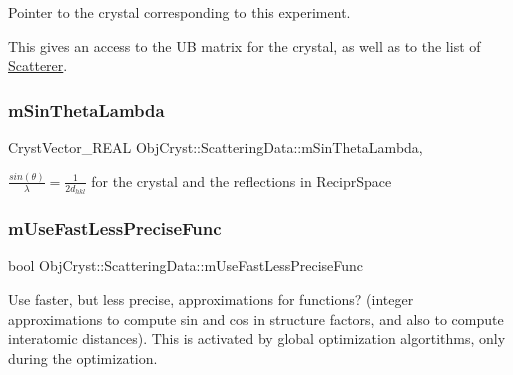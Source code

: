 Pointer to the crystal corresponding to this experiment.

This gives an access to the UB matrix for the crystal, as well as to the list of \mbox{\hyperlink{class_obj_cryst_1_1_scatterer}{Scatterer}}. \mbox{\label{class_obj_cryst_1_1_scattering_data_a06804c1df56b267a8ecb0218e061bdb4}} 
\subsubsection{\texorpdfstring{mSinThetaLambda}{mSinThetaLambda}}
{\footnotesize\ttfamily Cryst\+Vector\+\_\+\+R\+E\+AL Obj\+Cryst\+::\+Scattering\+Data\+::m\+Sin\+Theta\+Lambda\hspace{0.3cm}{\ttfamily [mutable]}, {\ttfamily [protected]}}

$ \frac{sin(\theta)}{\lambda} = \frac{1}{2d_{hkl}}$ for the crystal and the reflections in Recipr\+Space \mbox{\label{class_obj_cryst_1_1_scattering_data_a7a3fa9e9ea5c3a1dc6076f69ad584ad7}} 
\subsubsection{\texorpdfstring{mUseFastLessPreciseFunc}{mUseFastLessPreciseFunc}}
{\footnotesize\ttfamily bool Obj\+Cryst\+::\+Scattering\+Data\+::m\+Use\+Fast\+Less\+Precise\+Func\hspace{0.3cm}{\ttfamily [protected]}}

Use faster, but less precise, approximations for functions? (integer approximations to compute sin and cos in structure factors, and also to compute interatomic distances). This is activated by global optimization algortithms, only during the optimization. \mbox{\label{class_obj_cryst_1_1_scattering_data_a13e1ec375416a17f94370a4cf4bd5583}} 
